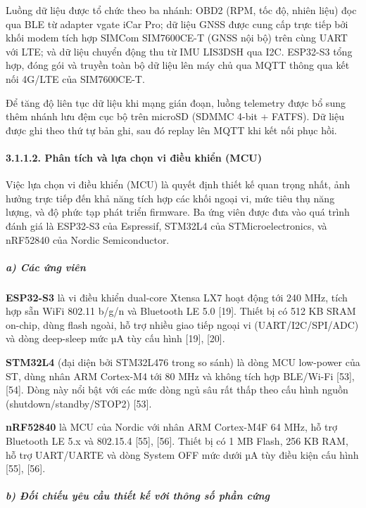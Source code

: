 \documentclass[a4paper]{extarticle}
\begin{document}
Luồng dữ liệu được tổ chức theo ba nhánh: OBD2 (RPM, tốc độ, nhiên liệu)
đọc qua BLE từ adapter vgate iCar Pro; dữ liệu GNSS được cung cấp trực
tiếp bởi khối modem tích hợp SIMCom SIM7600CE-T (GNSS nội bộ) trên cùng
UART với LTE; và dữ liệu chuyển động thu từ IMU LIS3DSH qua I2C.
ESP32-S3 tổng hợp, đóng gói và truyền toàn bộ dữ liệu lên máy chủ qua
MQTT thông qua kết nối 4G/LTE của SIM7600CE-T.

Để tăng độ liên tục dữ liệu khi mạng gián đoạn, luồng telemetry được bổ
sung thêm nhánh lưu đệm cục bộ trên microSD (SDMMC 4-bit + FATFS). Dữ
liệu được ghi theo thứ tự bản ghi, sau đó replay lên MQTT khi kết nối
phục hồi.

\paragraph{3.1.1.2. Phân tích và lựa chọn vi điều khiển
(MCU)}\label{3112-phuxe2n-tuxedch-vuxe0-lux1ef1a-chux1ecdn-vi-ux111iux1ec1u-khiux1ec3n-mcu}

Việc lựa chọn vi điều khiển (MCU) là quyết định thiết kế quan trọng
nhất, ảnh hưởng trực tiếp đến khả năng tích hợp các khối ngoại vi, mức
tiêu thụ năng lượng, và độ phức tạp phát triển firmware. Ba ứng viên
được đưa vào quá trình đánh giá là ESP32-S3 của Espressif, STM32L4 của
STMicroelectronics, và nRF52840 của Nordic Semiconductor.

\subparagraph{a) Các ứng viên}\label{a-cuxe1c-ux1ee9ng-viuxean}

\textbf{ESP32-S3} là vi điều khiển dual-core Xtensa LX7 hoạt động tới
240 MHz, tích hợp sẵn WiFi 802.11 b/g/n và Bluetooth LE 5.0 {[}19{]}.
Thiết bị có 512 KB SRAM on-chip, dùng flash ngoài, hỗ trợ nhiều giao
tiếp ngoại vi (UART/I2C/SPI/ADC) và dòng deep-sleep mức µA tùy cấu hình
{[}19{]}, {[}20{]}.

\textbf{STM32L4} (đại diện bởi STM32L476 trong so sánh) là dòng MCU
low-power của ST, dùng nhân ARM Cortex-M4 tới 80 MHz và không tích hợp
BLE/Wi-Fi {[}53{]}, {[}54{]}. Dòng này nổi bật với các mức dòng ngủ sâu
rất thấp theo cấu hình nguồn (shutdown/standby/STOP2) {[}53{]}.

\textbf{nRF52840} là MCU của Nordic với nhân ARM Cortex-M4F 64 MHz, hỗ
trợ Bluetooth LE 5.x và 802.15.4 {[}55{]}, {[}56{]}. Thiết bị có 1 MB
Flash, 256 KB RAM, hỗ trợ UART/UARTE và dòng System OFF mức dưới µA tùy
điều kiện cấu hình {[}55{]}, {[}56{]}.

\subparagraph{b) Đối chiếu yêu cầu thiết kế với thông số phần
cứng}\label{b-ux111ux1ed1i-chiux1ebfu-yuxeau-cux1ea7u-thiux1ebft-kux1ebf-vux1edbi-thuxf4ng-sux1ed1-phux1ea7n-cux1ee9ng}
\end{document}
